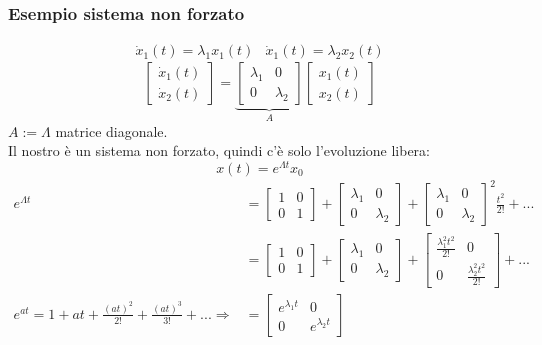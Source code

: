 \documentclass{article}
\numberwithin{equation}{subsection}
\begin{document}
\subsubsection{Esempio sistema non forzato}
\begin{align*}
    \dot x_1(t) = \lambda_1 x_1(t) & \dot x_1(t) = \lambda_2 x_2(t)
\end{align*}
\begin{equation}
    \begin{bmatrix}
        \dot x_1(t)\\
        \dot x_2(t)
    \end{bmatrix}
    =
    \underbrace{\begin{bmatrix}
        \lambda_1 & 0\\
        0 & \lambda_2  
    \end{bmatrix}}_{A}
    \begin{bmatrix}
        x_1(t)\\
        x_2(t)
    \end{bmatrix}
\end{equation}
$A := \Lambda$ matrice diagonale.
\vspace*{0.2cm}\\
Il nostro è un sistema non forzato, quindi c'è solo l'evoluzione libera:
\begin{equation}
    x(t) = e^{\Lambda t}x_0
\end{equation}
\begin{align*}
    e^{\Lambda t} &= 
    \begin{bmatrix}
        1 & 0\\
        0 & 1
    \end{bmatrix}
    +
    \begin{bmatrix}
        \lambda_1 & 0\\
        0 & \lambda_2
    \end{bmatrix}
    +
    \begin{bmatrix}
        \lambda_1 & 0\\
        0 & \lambda_2
    \end{bmatrix}^2 \frac{t^2}{2!} + ...\\
    &=\begin{bmatrix}
        1 & 0\\
        0 & 1
    \end{bmatrix}
    +
    \begin{bmatrix}
        \lambda_1 & 0\\
        0 & \lambda_2
    \end{bmatrix}
    +
    \begin{bmatrix}
        \frac{\lambda_1^2 t^2}{2!} & 0\\
        0 & \frac{\lambda_2^2 t^2}{2!}
    \end{bmatrix} + ...\\
    e^{at} = 1 + at + \frac{(at)^2}{2!} + \frac{(at)^3}{3!} + ... \Longrightarrow&=
    \begin{bmatrix}
        e^{\lambda_1 t} & 0\\
        0 & e^{\lambda_2 t}
    \end{bmatrix}
\end{align*}
\end{document}
